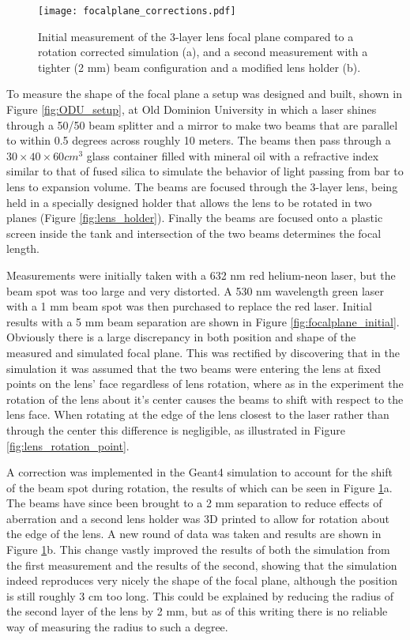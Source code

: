 \begin{figure}[ht]
	\centering
	\texttt{[image: focalplane\_corrections.pdf]}
	\caption{Initial measurement of the 3-layer lens focal plane compared to a rotation corrected simulation (a), and a second measurement with a tighter (2 mm) beam configuration and a modified lens holder (b).}
	\label{fig:focalplane_corrections}
\end{figure}

To measure the shape of the focal plane a setup was designed and built, shown in Figure \ref{fig:ODU_setup}, at Old Dominion University in which a laser shines through a 50/50 beam splitter and a mirror to make two beams that are parallel to within 0.5 degrees across roughly 10 meters. The beams then pass through a $30\times40\times60\unit{cm}^3$ glass container filled with mineral oil with a refractive index similar to that of fused silica to simulate the behavior of light passing from bar to lens to expansion volume. The beams are focused through the 3-layer lens, being held in a specially designed holder that allows the lens to be rotated in two planes (Figure \ref{fig:lens_holder}). Finally the beams are focused onto a plastic screen inside the tank and intersection of the two beams determines the focal length.

Measurements were initially taken with a 632 nm red helium-neon laser, but the beam spot was too large and very distorted. A 530 nm wavelength green laser with a 1 mm beam spot was then purchased to replace the red laser. Initial results with a 5 mm beam separation are shown in Figure \ref{fig:focalplane_initial}. Obviously there is a large discrepancy in both position and shape of the measured and simulated focal plane. This was rectified by discovering that in the simulation it was assumed that the two beams were entering the lens at fixed points on the lens' face regardless of lens rotation, where as in the experiment the rotation of the lens about it's center causes the beams to shift with respect to the lens face. When rotating at the edge of the lens closest to the laser rather than through the center this difference is negligible, as illustrated in Figure \ref{fig:lens_rotation_point}.

A correction was implemented in the Geant4 simulation to account for the shift of the beam spot during rotation, the results of which can be seen in Figure \ref{fig:focalplane_corrections}a. The beams have since been brought to a 2 mm separation to reduce effects of aberration and a second lens holder was 3D printed to allow for rotation about the edge of the lens. A new round of data was taken and results are shown in Figure \ref{fig:focalplane_corrections}b. This change vastly improved the results of both the simulation from the first measurement and the results of the second, showing that the simulation indeed reproduces very nicely the shape of the focal plane, although the position is still roughly 3 cm too long. This could be explained by reducing the radius of the second layer of the lens by 2 mm, but as of this writing there is no reliable way of measuring the radius to such a degree.

